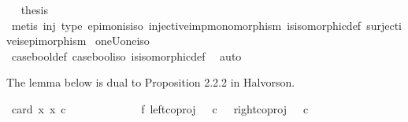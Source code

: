 \begin{isabellebody}
\ \isamarkupfalse%
\ {\isacharquery}{\kern0pt}thesis\isanewline
\ \ \ \ \isamarkupfalse%
\ {\isacharparenleft}{\kern0pt}metis\ {\isasymrho}{\isacharunderscore}{\kern0pt}inj\ {\isasymrho}{\isacharunderscore}{\kern0pt}type\ epi{\isacharunderscore}{\kern0pt}mon{\isacharunderscore}{\kern0pt}is{\isacharunderscore}{\kern0pt}iso\ injective{\isacharunderscore}{\kern0pt}imp{\isacharunderscore}{\kern0pt}monomorphism\ is{\isacharunderscore}{\kern0pt}isomorphic{\isacharunderscore}{\kern0pt}def\ surjective{\isacharunderscore}{\kern0pt}is{\isacharunderscore}{\kern0pt}epimorphism{\isacharparenright}{\kern0pt}\isanewline
{}\isamarkupfalse%
%
\endisatagproof
{\isafoldproof}%
%
\isadelimproof
\isanewline
%
\endisadelimproof
\isanewline
{}\isamarkupfalse%
\ oneUone{\isacharunderscore}{\kern0pt}iso{\isacharunderscore}{\kern0pt}{\isasymOmega}{\isacharcolon}{\kern0pt}\isanewline
\ \ {\isachardoublequoteopen}{\isasymOmega}\ {\isasymcong}\ {\isasymone}\ {\isasymCoprod}\ {\isasymone}{\isachardoublequoteclose}\isanewline
%
\isadelimproof
\ \ %
\endisadelimproof
%
\isatagproof
{}\isamarkupfalse%
\ case{\isacharunderscore}{\kern0pt}bool{\isacharunderscore}{\kern0pt}def{}\ case{\isacharunderscore}{\kern0pt}bool{\isacharunderscore}{\kern0pt}iso\ is{\isacharunderscore}{\kern0pt}isomorphic{\isacharunderscore}{\kern0pt}def\ \isamarkupfalse%
\ auto%
\endisatagproof
{\isafoldproof}%
%
\isadelimproof
%
\endisadelimproof
%
\begin{isamarkuptext}%
The lemma below is dual to Proposition 2.2.2 in Halvorson.%
\end{isamarkuptext}\isamarkuptrue%
\isamarkupfalse%
\ {\isachardoublequoteopen}card\ {\isacharbraceleft}{\kern0pt}x{\isachardot}{\kern0pt}\ x\ {\isasymin}\isactrlsub c\ {\isasymOmega}\ {\isasymCoprod}\ {\isasymOmega}{\isacharbraceright}{\kern0pt}\ {\isacharequal}{\kern0pt}\ {}{\isachardoublequoteclose}\isanewline
%
\isadelimproof
%
\endisadelimproof
%
\isatagproof
{}\isamarkupfalse%
\ {\isacharminus}{\kern0pt}\isanewline
\ \ \isanewline
\ \ \isamarkupfalse%
\ f{}{\isacharcolon}{\kern0pt}\ {\isachardoublequoteopen}{\isacharparenleft}{\kern0pt}left{\isacharunderscore}{\kern0pt}coproj\ {\isasymOmega}\ {\isasymOmega}{\isacharparenright}{\kern0pt}\ {\isasymcirc}\isactrlsub c\ {\isasymt}\ {\isasymnoteq}\ {\isacharparenleft}{\kern0pt}right{\isacharunderscore}{\kern0pt}coproj\ {\isasymOmega}\ {\isasymOmega}{\isacharparenright}{\kern0pt}\ {\isasymcirc}\isactrlsub c\ {\isasymt}{\isachardoublequoteclose}\isanewline

\end{isabellebody}
